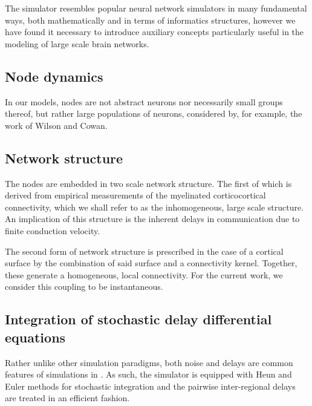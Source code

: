 The \TVB simulator resembles popular neural network simulators in 
many fundamental ways, both mathematically and in terms of informatics 
structures, however we have found it necessary to introduce auxiliary
concepts particularly useful in the modeling of large scale brain 
networks.


\subsection{Node dynamics}

	In our models, nodes are not abstract neurons nor necessarily 
	small groups thereof, but rather large populations of neurons, considered
	by, for example, the work of Wilson and Cowan. 


\subsection{Network structure}
	
	The nodes are embedded in two scale network structure. The first of which
	is derived from empirical measurements of the myelinated corticocortical
	connectivity, which we shall refer to as the inhomogeneous, large scale
	structure. An implication of this structure is the inherent delays in 
	communication due to finite conduction velocity.

	The second form of network structure is prescribed in the case of a 
	cortical surface by the combination of said surface and a connectivity
	kernel. Together, these generate a homogeneous, local connectivity. 
	For the current work, we consider this coupling to be instantaneous.


\subsection{Integration of stochastic delay differential equations}

	Rather unlike other simulation paradigms, both noise and delays are
	common features of simulations in \TVB. As such, the simulator is equipped
	with Heun and Euler methods for stochastic integration and the pairwise
	inter-regional delays are treated in an efficient fashion. 


